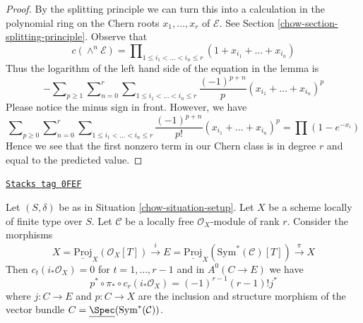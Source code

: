 \begin{proof}
By the splitting principle we can turn this into a calculation in the
polynomial ring on the Chern roots $x_1, \ldots, x_r$ of $\mathcal{E}$. See
Section \ref{chow-section-splitting-principle}. Observe that
$$
c(\wedge^n \mathcal{E}) =
\prod\nolimits_{1 \leq i_1 < \ldots < i_n \leq r}
(1 + x_{i_1} + \ldots + x_{i_n})
$$
Thus the logarithm of the left hand side of the equation in the lemma is
$$
-
\sum\nolimits_{p \geq 1}
\sum\nolimits_{n = 0}^r
\sum\nolimits_{1 \leq i_1 < \ldots < i_n \leq r}
\frac{(-1)^{p + n}}{p}(x_{i_1} + \ldots + x_{i_n})^p
$$
Please notice the minus sign in front. However, we have
$$
\sum\nolimits_{p \geq 0}
\sum\nolimits_{n = 0}^r
\sum\nolimits_{1 \leq i_1 < \ldots < i_n \leq r}
\frac{(-1)^{p + n}}{p!}(x_{i_1} + \ldots + x_{i_n})^p
=
\prod (1 - e^{-x_i})
$$
Hence we see that the first nonzero term in our Chern class
is in degree $r$ and equal to the predicted value.
\end{proof}

\begin{lemma}
\label{chow-lemma-compute-section}
\href{https://stacks.math.columbia.edu/tag/0FEF}{\texttt{Stacks tag 0FEF}}

Let $(S, \delta)$ be as in Situation \ref{chow-situation-setup}. Let $X$
be a scheme locally of finite type over $S$. Let $\mathcal{C}$
be a locally free $\mathcal{O}_X$-module of rank $r$. Consider the
morphisms
$$
X = \underline{\text{Proj}}_X(\mathcal{O}_X[T])
\xrightarrow{i}
E = \underline{\text{Proj}}_X(\text{Sym}^*(\mathcal{C})[T])
\xrightarrow{\pi}
X
$$
Then $c_t(i_*\mathcal{O}_X) = 0$ for $t = 1, \ldots, r - 1$ and in
$A^0(C \to E)$ we have
$$
p^* \circ \pi_* \circ c_r(i_*\mathcal{O}_X) = (-1)^{r - 1}(r - 1)! j^*
$$
where
$j : C \to E$ and $p : C \to X$ are the inclusion and structure
morphism of the vector bundle
$C = \underline{\Spec}(\text{Sym}^*(\mathcal{C}))$.
\end{lemma}

